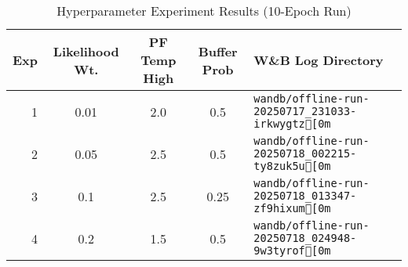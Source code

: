 \begin{table}[h!]
  \centering
  \caption{Hyperparameter Experiment Results (10-Epoch Run)}
  \label{tab:exp_results_10epochs}
  \begin{tabular}{rcccl}
    \toprule
    \textbf{Exp} & \textbf{Likelihood Wt.} & \textbf{PF Temp High} & \textbf{Buffer Prob} & \textbf{W\&B Log Directory} \\
    \midrule
    1 & 0.01 & 2.0 & 0.5 & \texttt{wandb/offline-run-20250717\_231033-irkwygtz[0m} \\
    2 & 0.05 & 2.5 & 0.5 & \texttt{wandb/offline-run-20250718\_002215-ty8zuk5u[0m} \\
    3 & 0.1 & 2.5 & 0.25 & \texttt{wandb/offline-run-20250718\_013347-zf9hixum[0m} \\
    4 & 0.2 & 1.5 & 0.5 & \texttt{wandb/offline-run-20250718\_024948-9w3tyrof[0m} \\
    \bottomrule
  \end{tabular}
\end{table}
